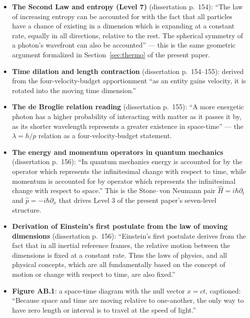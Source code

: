\documentclass[11pt,a4paper]{article}
\begin{document}
\begin{itemize}
\item \textbf{The Second Law and entropy (Level 7)} (dissertation p.\ 154): ``The law of increasing entropy can be accounted for with the fact that all particles have a chance of existing in a dimension which is expanding at a constant rate, equally in all directions, relative to the rest. The spherical symmetry of a photon's wavefront can also be accounted'' --- this is the same geometric argument formalized in Section~\ref{sec:thermo} of the present paper.

\item \textbf{Time dilation and length contraction} (dissertation p.\ 154--155): derived from the four-velocity-budget apportionment ``as an entity gains velocity, it is rotated into the moving time dimension.''

\item \textbf{The de Broglie relation reading} (dissertation p.\ 155): ``A more energetic photon has a higher probability of interacting with matter as it passes it by, as its shorter wavelength represents a greater existence in space-time'' --- the $\lambda = h/p$ relation as a four-velocity-budget statement.

\item \textbf{The energy and momentum operators in quantum mechanics} (dissertation p.\ 156): ``In quantum mechanics energy is accounted for by the operator which represents the infinitesimal change with respect to time, while momentum is accounted for by operator which represents the infinitesimal change with respect to space.'' This is the Stone--von Neumann pair $\hat{H} = i\hbar \partial_t$ and $\hat{p} = -i\hbar \partial_x$ that drives Level 3 of the present paper's seven-level structure.

\item \textbf{Derivation of Einstein's first postulate from the law of moving dimensions} (dissertation p.\ 156): ``Einstein's first postulate derives from the fact that in all inertial reference frames, the relative motion between the dimensions is fixed at a constant rate. Thus the laws of physics, and all physical concepts, which are all fundamentally based on the concept of motion or change with respect to time, are also fixed.''

\item \textbf{Figure AB.1}: a space-time diagram with the null vector $x = ct$, captioned: ``Because space and time are moving relative to one-another, the only way to have zero length or interval is to travel at the speed of light.''
\end{itemize}
\end{document}
